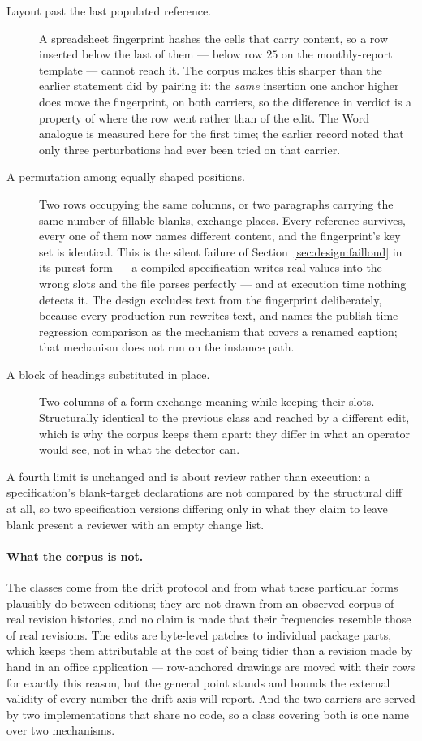 \begin{description}
  \item[Layout past the last populated reference.] A spreadsheet fingerprint hashes the cells
    that carry content, so a row inserted below the last of them --- below row $25$ on the
    monthly-report template --- cannot reach it. The corpus makes this sharper than the earlier
    statement did by pairing it: the \emph{same} insertion one anchor higher does move the
    fingerprint, on both carriers, so the difference in verdict is a property of where the row
    went rather than of the edit. The Word analogue is measured here for the first time; the
    earlier record noted that only three perturbations had ever been tried on that carrier.
  \item[A permutation among equally shaped positions.] Two rows occupying the same columns, or
    two paragraphs carrying the same number of fillable blanks, exchange places. Every reference
    survives, every one of them now names different content, and the fingerprint's key set is
    identical. This is the silent failure of Section~\ref{sec:design:failloud} in its purest
    form --- a compiled specification writes real values into the wrong slots and the file
    parses perfectly --- and at execution time nothing detects it. The design excludes text from
    the fingerprint deliberately, because every production run rewrites text, and names the
    publish-time regression comparison as the mechanism that covers a renamed caption; that
    mechanism does not run on the instance path.
  \item[A block of headings substituted in place.] Two columns of a form exchange meaning while
    keeping their slots. Structurally identical to the previous class and reached by a different
    edit, which is why the corpus keeps them apart: they differ in what an operator would see,
    not in what the detector can.
\end{description}

A fourth limit is unchanged and is about review rather than execution: a specification's
blank-target declarations are not compared by the structural diff at all, so two specification
versions differing only in what they claim to leave blank present a reviewer with an empty
change list.

\paragraph{What the corpus is not.}
The classes come from the drift protocol and from what these particular forms plausibly do
between editions; they are not drawn from an observed corpus of real revision histories, and no
claim is made that their frequencies resemble those of real revisions. The edits are byte-level
patches to individual package parts, which keeps them attributable at the cost of being tidier
than a revision made by hand in an office application --- row-anchored drawings are moved with
their rows for exactly this reason, but the general point stands and bounds the external
validity of every number the drift axis will report. And the two carriers are served by two
implementations that share no code, so a class covering both is one name over two mechanisms.

